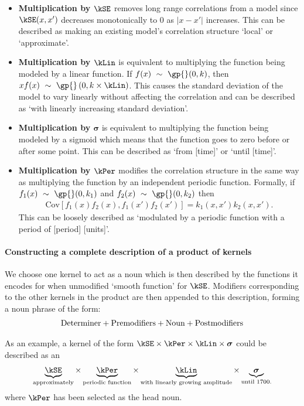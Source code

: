 \begin{itemize}
\item {\bf Multiplication by $\kSE$} removes long range correlations from a model since $\kSE(x,x')$ decreases monotonically to 0 as $|x - x'|$ increases.
This can be described as making an existing model's correlation structure `local' or `approximate'.
\item {\bf Multiplication by $\kLin$} is equivalent to multiplying the function being modeled by a linear function.
If $f(x) \dist \gp{}(0, \kernel)$, then $xf(x) \dist \gp{}\left(0, k \times \kLin \right)$.
This causes the standard deviation of the model to vary linearly without affecting the correlation and can be described as \eg `with linearly increasing standard deviation'.
\item {\bf Multiplication by $\boldsymbol\sigma$} is equivalent to multiplying the function being modeled by a sigmoid which means that the function goes to zero before or after some point.
This can be described as \eg `from [time]' or `until [time]'.
\item {\bf Multiplication by $\kPer$}
modifies the correlation structure in the same way as multiplying the function by an independent periodic function.
Formally, if ${f_1(x) \dist \gp{}(0, \kernel_1)}$ and ${f_2(x) \dist \gp{}(0, \kernel_2)}$ then
\begin{align}
{\textrm{Cov} \left[f_1(x)f_2(x), f_1(x')f_2(x') \right] = k_1(x,x')k_2(x,x')}.\nonumber
\end{align}
This can be loosely described as \eg `modulated by a periodic function with a period of [period] [units]'.
\end{itemize}

\paragraph{Constructing a complete description of a product of kernels}
We choose one kernel to act as a noun which is then described by the functions it encodes for when unmodified \eg `smooth function' for $\kSE$.
Modifiers corresponding to the other kernels in the product are then appended to this description, forming a noun phrase of the form:
\begin{align*}
\textnormal{Determiner}	+	\textnormal{Premodifiers} +	\textnormal{Noun}	+	\textnormal{Postmodifiers}
\end{align*}

As an example, a kernel of the form $\kSE \times \kPer \times  \kLin \times \boldsymbol{\sigma}$ could be described as an
\begin{align*}
\underbrace{\kSE}_{\textnormal{\scriptsize approximately}} \times 
\underbrace{\kPer}_{\textnormal{\scriptsize periodic function}} \times 
\underbrace{\kLin}_{\textnormal{\scriptsize with linearly growing amplitude}} \times 
\underbrace{\boldsymbol{\sigma}}_{\textnormal{\scriptsize until 1700.}}
\end{align*}
where $\kPer$ has been selected as the head noun.

